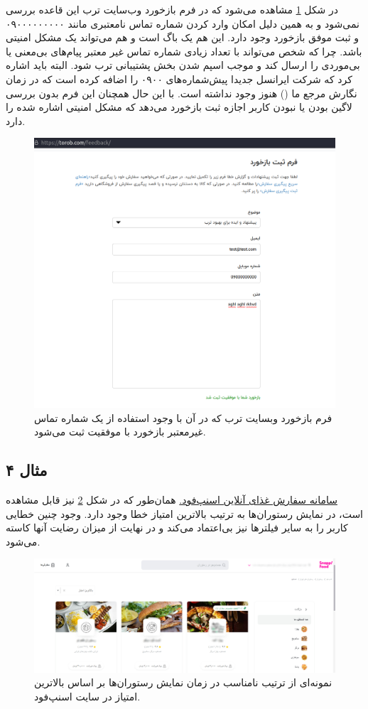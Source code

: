 {در شکل \ref{fig:bug3} مشاهده می‌شود که در فرم بازخورد وب‌سایت ترب این قاعده بررسی نمی‌شود و به همین دلیل امکان وارد کردن شماره تماس نامعتبری مانند ۰۹۰۰۰۰۰۰۰۰۰ و ثبت موفق بازخورد وجود دارد. این هم یک باگ است و هم می‌تواند یک مشکل امنیتی باشد. چرا که شخص می‌تواند با تعداد زیادی شماره تماس غیر معتبر پیام‌های بی‌معنی یا بی‌موردی را ارسال کند و موجب اسپم شدن بخش پشتیبانی ترب شود. البته باید اشاره کرد که شرکت ایرانسل جدیدا پیش‌شماره‌های ۰۹۰۰ را اضافه کرده است که در زمان نگارش مرجع ما (\cite{phoneregex}) هنوز وجود نداشته است. با این حال همچنان این فرم بدون بررسی لاگین بودن یا نبودن کاربر اجازه ثبت بازخورد می‌دهد که مشکل امنیتی اشاره شده را دارد.

\begin{figure}[H]
	\centering
	\includegraphics[width=0.7\linewidth]{figs/bug3}
	\caption[فرم بازخورد وبسایت ترب]{فرم بازخورد وبسایت ترب که در آن با وجود استفاده از یک شماره تماس غیرمعتبر بازخورد با موفقیت ثبت می‌شود.}
	\label{fig:bug3}
\end{figure}


\subsection*{مثال ۴}
\href{https://snappfood.ir/service/restaurant/city/Tehran/near?page=0&section=SERVICES&sort=max_rate&superType=1}{سامانه سفارش غذای آنلاین اسنپ‌فود.}
همان‌طور که در شکل \ref{fig:bug4} نیز قابل مشاهده است، در نمایش رستوران‌ها به ترتیب بالاترین امتیاز خطا وجود دارد. وجود چنین خطایی کاربر را به سایر فیلترها نیز بی‌اعتماد می‌کند و در نهایت از میزان رضایت آنها کاسته می‌شود.

\begin{figure}[H]
	\centering
	\includegraphics[width=0.7\linewidth]{figs/bug4.jpg}
	\caption{نمونه‌ای از ترتیب نامناسب در زمان نمایش رستوران‌ها بر اساس بالاترین امتیاز در سایت اسنپ‌فود.}
	\label{fig:bug4}
\end{figure}

}
